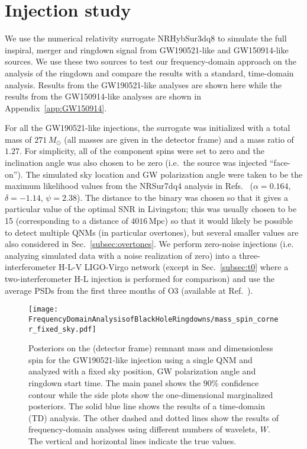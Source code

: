 \section{Injection study}\label{sec:injection_study}

We use the numerical relativity surrogate NRHybSur3dq8 \cite{Varma:2018mmi} to simulate the full inspiral, merger and ringdown signal from GW190521-like and GW150914-like sources. 
We use these two sources to test our frequency-domain approach on the analysis of the ringdown and compare the results with a standard, time-domain analysis.
Results from the GW190521-like analyses are shown here while the results from the GW150914-like analyses are shown in Appendix~\ref{app:GW150914}.

For all the GW190521-like injections, the surrogate was initialized with a total mass of $271\,M_\odot$ (all masses are given in the detector frame) and a mass ratio of $1.27$. 
For simplicity, all of the component spins were set to zero and the inclination angle was also chosen to be zero (i.e.\ the source was injected ``face-on'').
The simulated sky location and GW polarization angle were taken to be the maximum likelihood values from the NRSur7dq4 analysis in Refs.~\cite{LIGOScientific:2020ibl, gwtc2datarelease} ($\alpha = 0.164$, $\delta = -1.14$, $\psi = 2.38$).
The distance to the binary was chosen so that it gives a particular value of the optimal SNR in Livingston; this was usually chosen to be 15 (corresponding to a distance of $4016\,\mathrm{Mpc}$) so that it would likely be possible to detect multiple QNMs (in particular overtones), but several smaller values are also considered in Sec.~\ref{subsec:overtones}.
We perform zero-noise injections (i.e. analyzing simulated data with a noise realization of zero) into a three-interferometer H-L-V LIGO-Virgo network (except in Sec.~\ref{subsec:t0} where a two-interferometer H-L injection is performed for comparison) and use the average PSDs from the first three months of O3 (available at Ref.~\cite{o3psd}).

\begin{figure}[t]
	\centering
	\texttt{[image: FrequencyDomainAnalysisofBlackHoleRingdowns/mass\_spin\_corner\_fixed\_sky.pdf]}
	\caption[Posteriors on the remnant mass and spin for a GW190521-like injection analyzed with a fixed sky position, GW polarization angle and ringdown start time]{ 
		Posteriors on the (detector frame) remnant mass and dimensionless spin for the GW190521-like injection using a single QNM and analyzed with a fixed sky position, GW polarization angle and ringdown start time.
		The main panel shows the $90\%$ confidence contour while the side plots show the one-dimensional marginalized posteriors.
		The solid blue line shows the results of a time-domain (TD) analysis.
		The other dashed and dotted lines show the results of frequency-domain analyses using different numbers of wavelets, $W$.
		The vertical and horizontal lines indicate the true values.
	}
	\label{fig:mass_spin_corner_fixed_sky}
\end{figure}

